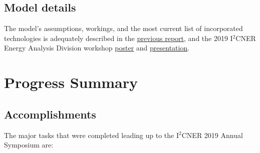 \documentclass[14pt,a4paper]{article} %
\begin{document}
\subsection{Model details}
The model's assumptions, workings, and the most current list of incorporated technologies is adequately described in the \href{https://github.com/arfc/i2cner/tree/master/doc/2018-09-report}{previous report}, and the 2019 I$^2$CNER Energy Analysis Division workshop \href{https://github.com/arfc/i2cner/tree/master/doc/2019-01-poster}{poster} and \href{https://github.com/arfc/i2cner/tree/master/doc/2019-02-presentation}{presentation}.

\section{Progress Summary}

\subsection{Accomplishments}

The major tasks that were completed leading up to the I$^2$CNER 2019 Annual Symposium are:
\end{document}
